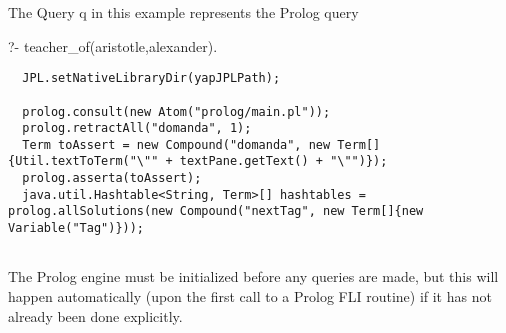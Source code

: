 The Query q in this example represents the Prolog query

\begin{prologcode}
  ?- teacher_of(aristotle,alexander).
\end{prologcode}

\begin{Verbatim}
  JPL.setNativeLibraryDir(yapJPLPath);
  
  prolog.consult(new Atom("prolog/main.pl"));
  prolog.retractAll("domanda", 1);
  Term toAssert = new Compound("domanda", new Term[]{Util.textToTerm("\"" + textPane.getText() + "\"")});
  prolog.asserta(toAssert);
  java.util.Hashtable<String, Term>[] hashtables = prolog.allSolutions(new Compound("nextTag", new Term[]{new Variable("Tag")}));
  
  \end{Verbatim}
The Prolog engine must be initialized before any queries are made, but this will happen automatically (upon the first call to a Prolog FLI routine) if it has not already been done explicitly.
